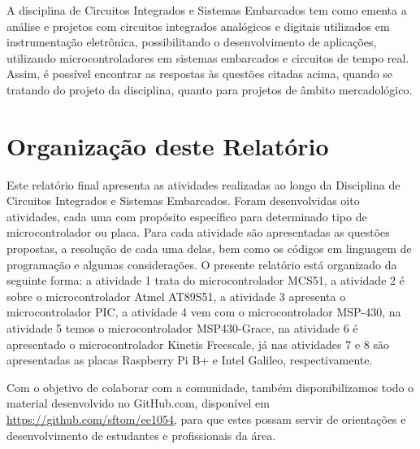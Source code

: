 \documentclass[
	12pt,				%
	openright,			%
  oneside,     %
	a4paper,			%
	english,			%
	french,				%
	spanish,			%
	brazil				%
	]{abntex2}
\begin{document}
A disciplina de Circuitos Integrados e Sistemas Embarcados tem como ementa a análise e projetos com circuitos integrados analógicos e digitais utilizados em instrumentação eletrônica, possibilitando o desenvolvimento de aplicações, utilizando microcontroladores em sistemas embarcados e circuitos de tempo real. Assim, é possível encontrar as respostas às questões citadas acima, quando se tratando do projeto da disciplina, quanto para projetos de âmbito mercadológico.

\section*{Organização deste Relatório} %
\label{sec:organizacao_deste_relatorio}

Este relatório final apresenta as atividades realizadas ao longo da Disciplina de Circuitos Integrados e Sistemas Embarcados. Foram desenvolvidas oito atividades, cada uma com propósito específico para determinado tipo de microcontrolador ou placa. Para cada atividade são apresentadas as questões propostas, a resolução de cada uma delas, bem como os códigos em linguagem de programação e algumas considerações. O presente relatório está organizado da seguinte forma: a atividade 1 trata do microcontrolador MCS51, a atividade 2 é sobre o microcontrolador Atmel AT89S51, a atividade 3 apresenta o microcontrolador PIC, a atividade 4 vem com o microcontrolador MSP-430, na atividade 5 temos o microcontrolador MSP430-Grace, na atividade 6 é apresentado o microcontrolador Kinetis Freescale, já nas atividades 7 e 8 são apresentadas as placas Raspberry Pi B+ e Intel Galileo, respectivamente.

Com o objetivo de colaborar com a comunidade, também disponibilizamos todo o material desenvolvido no GitHub.com, disponível em \url{https://github.com/sftom/ee1054}, para que estes possam servir de orientações e desenvolvimento de estudantes e profissionais da área.


%
%
\end{document}
